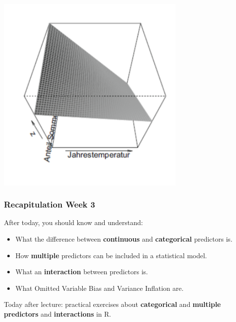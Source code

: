 \documentclass{beamer}
\begin{document}
\begin{frame}
    \frametitle{}
    \centering\includegraphics[width=0.7\textwidth]{lectures/day_3_LM_refresh_II/figures/2-cont-interactions.png}
\end{frame}

\begin{frame}
  \frametitle{Recapitulation Week 3}
  
  After today, you should know and understand:
  \begin{itemize}
    \item What the difference between \textbf{continuous} and \textbf{categorical} predictors is.
    \item How \textbf{multiple} predictors can be included in a statistical model.
    \item What an \textbf{interaction} between predictors is.
    \item What Omitted Variable Bias and Variance Inflation are.
  \end{itemize}
  
  \vspace{1cm}
  Today after lecture: practical exercises about \textbf{categorical} and \textbf{multiple predictors} and \textbf{interactions} in R.
\end{frame}
\end{document}
